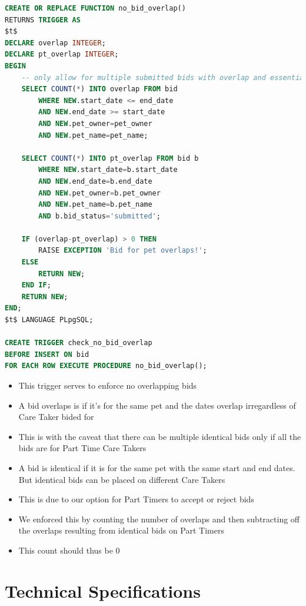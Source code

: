 \documentclass[
  paper=a4,
  ,captions=tableheading
]{scrartcl}
\providecommand{\tightlist}{%
  \setlength{\itemsep}{0pt}\setlength{\parskip}{0pt}}
\begin{document}
\begin{lstlisting}[language=SQL]
CREATE OR REPLACE FUNCTION no_bid_overlap()
RETURNS TRIGGER AS
$t$
DECLARE overlap INTEGER;
DECLARE pt_overlap INTEGER;
BEGIN
    -- only allow for multiple submitted bids with overlap and essentially are the same bid
    SELECT COUNT(*) INTO overlap FROM bid
        WHERE NEW.start_date <= end_date
        AND NEW.end_date >= start_date
        AND NEW.pet_owner=pet_owner
        AND NEW.pet_name=pet_name;

    SELECT COUNT(*) INTO pt_overlap FROM bid b
        WHERE NEW.start_date=b.start_date
        AND NEW.end_date=b.end_date
        AND NEW.pet_owner=b.pet_owner
        AND NEW.pet_name=b.pet_name
        AND b.bid_status='submitted';

    IF (overlap-pt_overlap) > 0 THEN
        RAISE EXCEPTION 'Bid for pet overlaps!';
    ELSE
        RETURN NEW;
    END IF;
    RETURN NEW;
END;
$t$ LANGUAGE PLpgSQL;

CREATE TRIGGER check_no_bid_overlap
BEFORE INSERT ON bid
FOR EACH ROW EXECUTE PROCEDURE no_bid_overlap();
\end{lstlisting}

\begin{itemize}
\tightlist
\item
  This trigger serves to enforce no overlapping bids
\item
  A bid overlaps is if it's for the same pet and the dates overlap
  irregardless of Care Taker bided for
\item
  This is with the caveat that there can be multiple identical bids only
  if all the bids are for Part Time Care Takers
\item
  A bid is identical if it is for the same pet with the same start and
  end dates. But identical bids can be placed on different Care Takers
\item
  This is due to our option for Part Timers to accept or reject bids
\item
  We enforced this by counting the number of overlaps and then
  subtracting off the overlaps resulting from identical bids on Part
  Timers
\item
  This count should thus be 0
\end{itemize}

\hypertarget{technical-specifications}{%
\section{Technical Specifications}\label{technical-specifications}}
\end{document}
